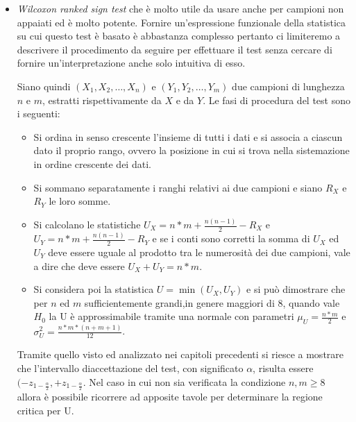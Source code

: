 \begin{itemize}
    \item \emph{Wilcoxon ranked sign test} che è molto utile da usare anche per campioni non appaiati ed è molto potente.\newline
          Fornire un'espressione funzionale della statistica su cui questo test è basato è abbastanza complesso 
          pertanto ci limiteremo a descrivere il procedimento da seguire per effettuare il test senza cercare
          di fornire un'interpretazione anche solo intuitiva di esso.

          Siano quindi $(X_1, X_2, \dots, X_n)$ e $(Y_1, Y_2, \dots, Y_m)$ due campioni di lunghezza $n$ e $m$, estratti
          rispettivamente da $X$ e da $Y$.\newline
          Le fasi di procedura del test sono i seguenti:
          \begin{itemize}
              \item Si ordina in senso crescente l'insieme di tutti i dati e si associa a ciascun dato il proprio rango,
                    ovvero la posizione in cui si trova nella sistemazione in ordine crescente dei dati.
              \item Si sommano separatamente i ranghi relativi ai due campioni e siano $R_X$ e $R_Y$ le loro somme.
              \item Si calcolano le statistiche $U_X = n * m + \frac{n(n - 1)}{2} - R_X$ e $U_Y = n * m + \frac{n(n - 1)}{2} - R_Y$
                    e se i conti sono corretti la somma di $U_X$ ed $U_Y$ deve essere uguale al prodotto tra le
                    numerosità dei due campioni, vale a dire che deve essere $U_X + U_Y = n * m$.
              \item Si considera poi la statistica $U = \min (U_X, U_Y)$ e si può dimostrare che per $n$ ed $m$ 
                    sufficientemente grandi,in genere maggiori di 8, quando vale $H_0$ la U è approssimabile
                    tramite una normale con parametri $\mu_U = \frac{n * m}{2}$ e $\sigma_U^2 = \frac{n * m * (n + m + 1)}{12}$.
          \end{itemize}
          Tramite quello visto ed analizzato nei capitoli precedenti si riesce a mostrare che 
          l'intervallo diaccettazione del test, con significato $\alpha$, risulta essere 
          $(-z_{1 - \frac{\alpha}{2}}, +z_{1 - \frac{\alpha}{2}}$.\newline
          Nel caso in cui non sia verificata la condizione $n, m \geq 8$ allora è possibile ricorrere ad
          apposite tavole per determinare la regione critica per U.


\end{itemize}
